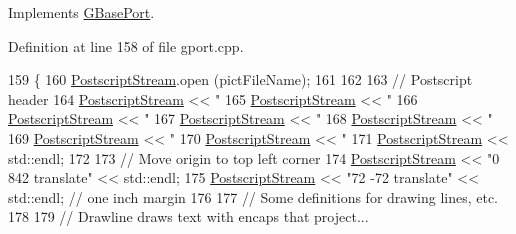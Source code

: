 Implements \mbox{\hyperlink{class_g_base_port_aad9e21ed63c4f04a508e30b7f100fba5}{G\+Base\+Port}}.



Definition at line 158 of file gport.\+cpp.


\begin{DoxyCode}
159 \{
160     \mbox{\hyperlink{class_g_postscript_port_a0fb398f1c65b3ccb0efccd509f60d20d}{PostscriptStream}}.open (pictFileName);
161         
162 
163     \textcolor{comment}{// Postscript header}
164     \mbox{\hyperlink{class_g_postscript_port_a0fb398f1c65b3ccb0efccd509f60d20d}{PostscriptStream}} << \textcolor{stringliteral}{"%
165     \mbox{\hyperlink{class_g_postscript_port_a0fb398f1c65b3ccb0efccd509f60d20d}{PostscriptStream}} << \textcolor{stringliteral}{"%
166     \mbox{\hyperlink{class_g_postscript_port_a0fb398f1c65b3ccb0efccd509f60d20d}{PostscriptStream}} << \textcolor{stringliteral}{"%
167     \mbox{\hyperlink{class_g_postscript_port_a0fb398f1c65b3ccb0efccd509f60d20d}{PostscriptStream}} << \textcolor{stringliteral}{"%
168     \mbox{\hyperlink{class_g_postscript_port_a0fb398f1c65b3ccb0efccd509f60d20d}{PostscriptStream}} << \textcolor{stringliteral}{"%
169     \mbox{\hyperlink{class_g_postscript_port_a0fb398f1c65b3ccb0efccd509f60d20d}{PostscriptStream}} << \textcolor{stringliteral}{"%
170     \mbox{\hyperlink{class_g_postscript_port_a0fb398f1c65b3ccb0efccd509f60d20d}{PostscriptStream}} << \textcolor{stringliteral}{"%
171     \mbox{\hyperlink{class_g_postscript_port_a0fb398f1c65b3ccb0efccd509f60d20d}{PostscriptStream}} << std::endl;
172 
173     \textcolor{comment}{// Move origin to top left corner}
174     \mbox{\hyperlink{class_g_postscript_port_a0fb398f1c65b3ccb0efccd509f60d20d}{PostscriptStream}} << \textcolor{stringliteral}{"0 842 translate"} << std::endl;
175     \mbox{\hyperlink{class_g_postscript_port_a0fb398f1c65b3ccb0efccd509f60d20d}{PostscriptStream}} << \textcolor{stringliteral}{"72 -72 translate"} << std::endl; \textcolor{comment}{// one inch margin}
176 
177     \textcolor{comment}{// Some definitions for drawing lines, etc.}
178 
179     \textcolor{comment}{// Drawline draws text with encaps that project...}
}}}}}}}
\end{DoxyCode}
